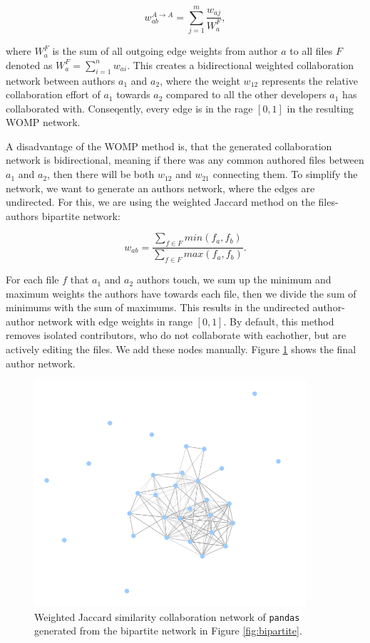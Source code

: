 \[ w_{ab}^{A \rightarrow A} = \sum_{j=1}^m \frac{w_{aj}}{W_a^F}, \]

where $W_a^F$ is the sum of all outgoing edge weights from author $a$ to all files $F$ denoted as $W_a^F = \sum_{i=1}^n w_{ai}$. This creates a bidirectional weighted collaboration network between authors $a_1$ and $a_2$, where the weight $w_{12}$ represents the relative collaboration effort of $a_1$ towards $a_2$ compared to all the other developers $a_1$ has collaborated with. Conseqently, every edge is in the rage $[0,1]$ in the resulting WOMP network.

A disadvantage of the WOMP method is, that the generated collaboration network is bidirectional, meaning if there was any common authored files between $a_1$ and $a_2$, then there will be both $w_{12}$ and $w_{21}$ connecting them. To simplify the network, we want to generate an authors network, where the edges are undirected. For this, we are using the weighted Jaccard method on the files-authors bipartite network:

\[ w_{ab} = \frac{\sum_{f \in F}min(f_a, f_b)}{\sum_{f \in F}max(f_a, f_b)}. \]

For each file $f$ that $a_1$ and $a_2$ authors touch, we sum up the minimum and maximum weights the authors have towards each file, then we divide the sum of minimums with the sum of maximums. This results in the undirected author-author network with edge weights in range $[0, 1]$. By default, this method removes isolated contributors, who do not collaborate with eachother, but are actively editing the files. We add these nodes manually. Figure \ref{fig:jaccard} shows the final author network.

\begin{figure}
    \centering
    \includegraphics[width=0.9\textwidth]{figures/jaccard.png}
    \caption{Weighted Jaccard similarity collaboration network of \texttt{pandas} generated from the bipartite network in Figure \ref{fig:bipartite}.}
    \label{fig:jaccard}
\end{figure}

